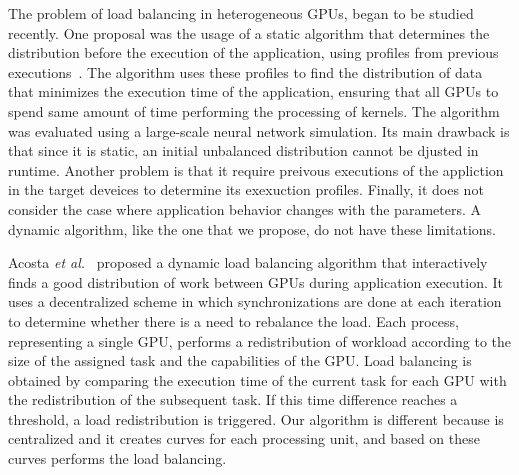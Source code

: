 \documentclass[journal]{IEEEtran}
\begin{document}
The problem of load balancing in heterogeneous GPUs, began to be studied
recently. One proposal was the usage of a static algorithm that determines the
distribution before the execution of the application, using profiles from
previous executions~\cite{raphael}. The algorithm uses these profiles to find
the distribution of data that minimizes the execution time of the application,
ensuring that all GPUs to spend same amount of time performing the processing of
kernels. The algorithm was evaluated using a large-scale neural network
simulation. Its main drawback is that since it is static, an initial unbalanced
distribution cannot be djusted in runtime. Another problem is that it require
preivous executions of the appliction in the target deveices to determine its
exexuction profiles. Finally, it does not consider the case where application
behavior changes with the parameters. A dynamic algorithm, like the one that we
propose, do not have these limitations.

Acosta \emph{et al.}~\cite{acosta} proposed a dynamic load balancing algorithm
that interactively finds a good distribution of work between GPUs during
application execution. It uses a decentralized scheme in which synchronizations
are done at each iteration to determine whether there is a need to rebalance the
load. Each process, representing a single GPU, performs a redistribution of
workload according to the size of the assigned task and the capabilities of the
GPU. Load balancing is obtained by comparing the execution time of the current
task for each GPU with the redistribution of the subsequent task. If this time
difference reaches a threshold, a load redistribution is triggered. Our
algorithm is different because is centralized and it creates curves for each
processing unit, and based on these curves performs the load balancing.
\end{document}
